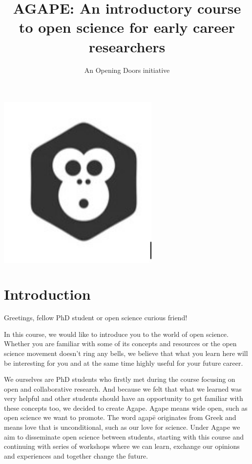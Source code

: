 \documentclass[
]{book}
\title{AGAPE: An introductory course to open science for early career researchers}
\author{An Opening Doors initiative}
\date{}
\begin{document}
\maketitle

{
\setcounter{tocdepth}{1}
\tableofcontents
}
\includegraphics[width=0.6\textwidth,height=\textheight]{images/agapecover.png}

\hypertarget{introduction}{%
\chapter*{Introduction}\label{introduction}}

Greetings, fellow PhD student or open science curious friend!

In this course, we would like to introduce you to the world of open science. Whether you are familiar with some of its concepts and resources or the open science movement doesn't ring any bells, we believe that what you learn here will be interesting for you and at the same time highly useful for your future career.

We ourselves are PhD students who firstly met during the course focusing on open and collaborative research. And because we felt that what we learned was very helpful and other students should have an opportunity to get familiar with these concepts too, we decided to create Agape. Agape means wide open, such as open science we want to promote. The word agapē originates from Greek and means love that is unconditional, such as our love for science. Under Agape we aim to disseminate open science between students, starting with this course and continuing with series of workshops where we can learn, exchange our opinions and experiences and together change the future.
\end{document}
